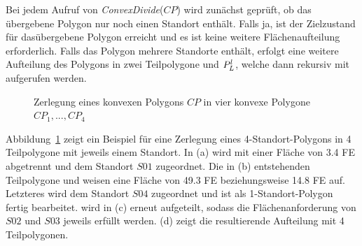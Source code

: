 \documentclass[ngerman]{seminarbeitrag}
\begin{document}
Bei jedem Aufruf von \textit{ConvexDivide}($CP$) wird zunächst geprüft, ob das übergebene Polygon nur noch einen Standort enthält. Falls ja, ist der Zielzustand für dasübergebene Polygon erreicht und es ist keine weitere Flächenaufteilung erforderlich. Falls das Polygon mehrere Standorte enthält, erfolgt eine weitere Aufteilung
des Polygons in zwei Teilpolygone \prl und $P_{L}^{l}$, welche dann rekursiv mit \con aufgerufen werden.\\

\begin{figure}[h]
    \centering
    \caption{Zerlegung eines konvexen Polygons $CP$ in vier konvexe Polygone $CP_{1},...,CP_{4}$}
    \label{erstes beispiel}
\end{figure}

Abbildung~\ref{erstes beispiel} zeigt ein Beispiel für eine Zerlegung eines 4-Standort-Polygons in 4 Teilpolygone mit jeweils einem Standort. In (a) wird \prl mit einer Fläche von 3.4 FE abgetrennt und dem Standort $S01$ zugeordnet. Die in (b) entstehenden Teilpolygone \prl und \pll weisen eine Fläche von 49.3 FE beziehungsweise 14.8 FE auf. Letzteres wird dem Standort $S04$ zugeordnet und ist als 1-Standort-Polygon fertig bearbeitet. \prl wird in (c) erneut aufgeteilt, sodass die Flächenanforderung von $S02$ und $S03$ jeweils erfüllt werden. (d) zeigt die resultierende Aufteilung mit 4 Teilpolygonen.  
\end{document}
